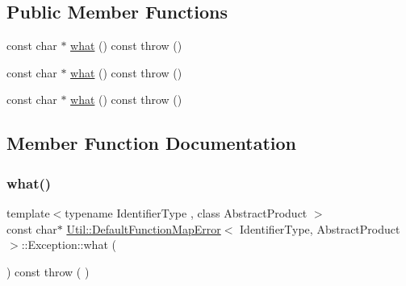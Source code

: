 \subsection*{Public Member Functions}
\begin{DoxyCompactItemize}
\item 
const char $\ast$ \mbox{\hyperlink{structUtil_1_1DefaultFunctionMapError_1_1Exception_aa9ee469b7675d8834d6c7ee08378cfbb}{what}} () const  throw ()
\item 
const char $\ast$ \mbox{\hyperlink{structUtil_1_1DefaultFunctionMapError_1_1Exception_aa9ee469b7675d8834d6c7ee08378cfbb}{what}} () const  throw ()
\item 
const char $\ast$ \mbox{\hyperlink{structUtil_1_1DefaultFunctionMapError_1_1Exception_aa9ee469b7675d8834d6c7ee08378cfbb}{what}} () const  throw ()
\end{DoxyCompactItemize}


\subsection{Member Function Documentation}
\mbox{\label{structUtil_1_1DefaultFunctionMapError_1_1Exception_aa9ee469b7675d8834d6c7ee08378cfbb}} 
\subsubsection{\texorpdfstring{what()}{what()}\hspace{0.1cm}{\footnotesize\ttfamily [1/3]}}
{\footnotesize\ttfamily template$<$typename Identifier\+Type , class Abstract\+Product $>$ \\
const char$\ast$ \mbox{\hyperlink{structUtil_1_1DefaultFunctionMapError}{Util\+::\+Default\+Function\+Map\+Error}}$<$ Identifier\+Type, Abstract\+Product $>$\+::Exception\+::what (\begin{DoxyParamCaption}{ }\end{DoxyParamCaption}) const throw ( ) \hspace{0.3cm}{\ttfamily [inline]}}

\mbox{\label{structUtil_1_1DefaultFunctionMapError_1_1Exception_aa9ee469b7675d8834d6c7ee08378cfbb}} 
